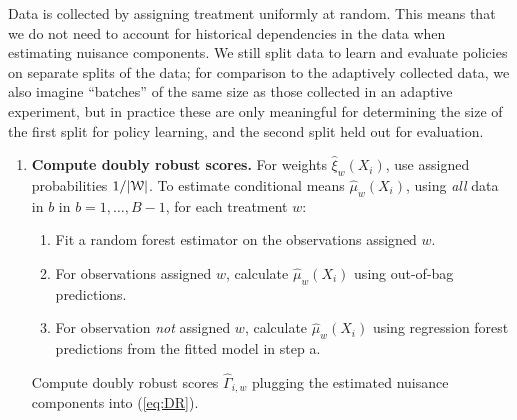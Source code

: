 \documentclass[letterpaper, 12pt, parskip=full,DIV=10]{scrartcl}
\begin{document}
Data is collected by assigning treatment uniformly at random. This means that we do not need to account for historical dependencies in the data when estimating nuisance components. We still split data to learn and evaluate policies on separate splits of the data; for comparison to the adaptively collected data, we also imagine ``batches'' of the same size as those collected in an adaptive experiment, but in practice these are only meaningful for determining the size of the first split for policy learning, and the second split held out for evaluation. 
\begin{enumerate}
    \item \textbf{Compute doubly robust scores.} For weights  $\hat\xi_w(X_i)$, use assigned probabilities $1/|{\EuScript W}|$. To estimate conditional means $\hat \mu_w(X_i)$, using \textit{all} data in $b$ in $b = 1, \dots, B-1$, for each treatment $w$:
    \begin{enumerate}
    \item Fit a random forest estimator on the observations assigned $w$. 
    \item For observations assigned $w$, calculate $\hat\mu_w(X_i)$ using out-of-bag predictions. 
    \item For observation \textit{not} assigned $w$, calculate $\hat\mu_w(X_i)$ using regression forest predictions from the fitted model in step a. 
    \end{enumerate}
 Compute doubly robust scores $\hat{\Gamma}_{i,w}$ plugging the estimated nuisance components into (\ref{eq:DR}). 

\end{enumerate}
\end{document}
